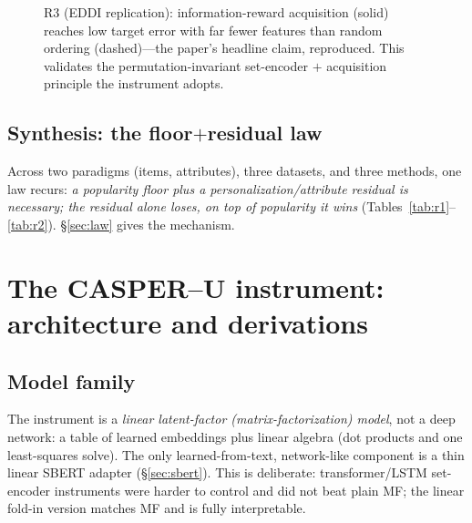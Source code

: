 \documentclass[11pt]{article}
\begin{document}
\begin{figure}[h]\centering
{}
\caption{R3 (EDDI replication): information-reward acquisition (solid) reaches low target error with far fewer
features than random ordering (dashed)---the paper's headline claim, reproduced. This validates the
permutation-invariant set-encoder $+$ acquisition principle the instrument adopts.}
\label{fig:eddi}
\end{figure}

\subsection{Synthesis: the floor$+$residual law}\label{sec:lawsynth}
Across two paradigms (items, attributes), three datasets, and three methods, one law recurs: \emph{a popularity
floor plus a personalization/attribute residual is necessary; the residual alone loses, on top of popularity it
wins} (Tables~\ref{tab:r1}--\ref{tab:r2}). \S\ref{sec:law} gives the mechanism.

\section{The CASPER--U instrument: architecture and derivations}\label{sec:arch}

\subsection{Model family}
The instrument is a \emph{linear latent-factor (matrix-factorization) model}, not a deep network: a table of
learned embeddings plus linear algebra (dot products and one least-squares solve). The only learned-from-text,
network-like component is a thin linear SBERT adapter (\S\ref{sec:sbert}). This is deliberate: transformer/LSTM
set-encoder instruments were harder to control and did not beat plain MF; the linear fold-in version matches MF
and is fully interpretable.
\end{document}
